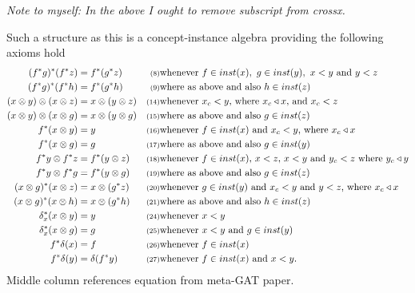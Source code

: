 \documentclass[10pt,a4paper]{article}
\begin{document}
\textit{Note to myself: In the above I ought to remove subscript from crossx.}

Such a structure as this is a concept-instance algebra providing the following axioms hold  
\begin{align}
(f^*g)^*(f^*z) &= f^*(g^*z)        &\mbox{\scriptsize(8)}& \mbox{whenever $f \in inst(x),\ g \in inst(y),\ x < y$ and  $y < z$} \\
(f^*g)^*(f^*h) &= f^*(g^*h)        &\mbox{\scriptsize(9)}& \mbox{where as above  and also $h \in inst(z)$ }\\
(x \cross y) \cross (x \cross z) &= x \cross (y \cross z)
                                   &\mbox{\scriptsize(14)}& \mbox{whenever $x_c < y$, where $x_c \base x$, and $x_c < z$} \\
(x \cross y) \cross (x \cross g) &= x \cross (y \cross g)
                                   &\mbox{\scriptsize(15)}& \mbox{where as above  and also $g \in inst(z)$}\\
f^*(x \cross y) &= y               &\mbox{\scriptsize(16)}& \mbox{whenever $f \in inst(x)$ and $x_c < y$, where $x_c \base x$}\\
f^*(x \cross g) &= g               &\mbox{\scriptsize(17)}& \mbox{where as above  and also $g \in inst(y)$}\\
f^*y \cross f^*z &= f^*(y \cross z)  %
                    &\mbox{\scriptsize(18)}& \mbox{whenever $f \in inst(x)$, $x < z$, $x < y$ and $y_c <z$ where $y_c \base y$}\\
f^*y \cross f^*g &= f^*(y \cross g)    &\mbox{\scriptsize(19)}& \mbox{where as above  and also $g \in inst(z)$}\\
(x \cross g)^*(x \cross z)&=x \cross(g^*z) &\mbox{\scriptsize(20)}& \mbox{whenever $g \in inst(y)$ and $x_c < y$ and $y < z$, where $x_c \base x$}\\
(x \cross g)^*(x \cross h)&=x \cross(g^*h) &\mbox{\scriptsize(21)}& \mbox{where as above  and also $h \in inst(z)$}\\
\delta_x ^*(x \cross y)&=y                 &\mbox{\scriptsize(24)}& \mbox{whenever  $x < y$}\\
\delta_x ^*(x \cross g)&=g                 &\mbox{\scriptsize(25)}& \mbox{whenever  $x < y$ and $g\in inst(y)$}\\
f \sub \diag(x) &= f                       &\mbox{\scriptsize(26)}& \mbox{whenever  $f \in inst(x)$}\\
f \sub \diag(y) &= \diag(f \sub y)         &\mbox{\scriptsize(27)}& \mbox{whenever  $f \in inst(x)$ and  $x < y$.}
\end{align}
Middle column references equation from meta-GAT paper.
\end{document}
